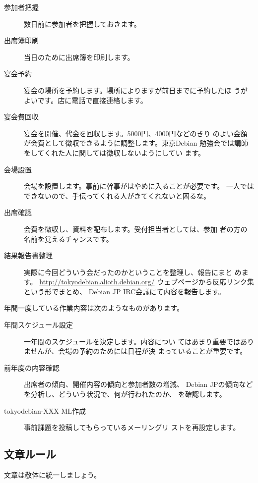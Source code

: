 \documentclass[mingoth,a4paper]{jsarticle}
\begin{document}
\begin{description}
\item[参加者把握]
	   数日前に参加者を把握しておきます。
\item[出席簿印刷]
	   当日のために出席簿を印刷します。
\item[宴会予約]
	   宴会の場所を予約します。場所によりますが前日までに予約したほ
	   うがよいです。店に電話で直接連絡します。
\item[宴会費回収] 宴会を開催、代金を回収します。5000円、4000円などのきり
	   のよい金額が会費として徴収できるように調整します。東京Debian
	   勉強会では講師をしてくれた人に関しては徴収しないようにしてい
	   ます。
\item[会場設置] 会場を設置します。事前に幹事がはやめに入ることが必要です。
	   一人ではできないので、手伝ってくれる人がきてくれないと困るな。
\item[出席確認] 会費を徴収し、資料を配布します。受付担当者としては、参加
	   者の方の名前を覚えるチャンスです。
\item[結果報告書整理] 
	   実際に今回どういう会だったのかということを整理し、報告にまと
	   めます。
	   \url{http://tokyodebian.alioth.debian.org/}
	   ウェブページから反応リンク集という形でまとめ、
	   Debian JP IRC会議にて内容を報告します。
\end{description}

年間一度している作業内容は次のようなものがあります。
\begin{description}
\item[年間スケジュール設定] 一年間のスケジュールを決定します。内容につい
	   てはあまり重要ではありませんが、会場の予約のためには日程が決
	   まっていることが重要です。
\item[前年度の内容確認] 出席者の傾向、開催内容の傾向と参加者数の増減、
	   Debian JPの傾向などを分析し、どういう状況で、何が行われたのか、
	   を確認します。
\item[tokyodebian-XXX ML作成] 事前課題を投稿してもらっているメーリングリ
	   ストを再設定します。
\end{description}


\label{sec:debmtg2007howtoprepare}

\subsection{文章ルール}

文章は敬体に統一しましょう。
\end{document}
